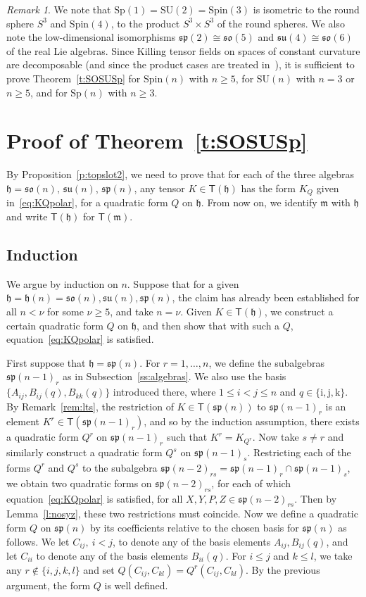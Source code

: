 \documentclass[12pt,reqno]{amsart}
\newcommand \Sp{\mathrm{Sp}}
\newcommand \SU{\mathrm{SU}}
\newcommand \Spin{\mathrm{Spin}}
\newcommand \sT{\mathsf{T}}
\newcommand\h{\mathfrak h}
\newcommand\m{\mathfrak m}
\newcommand \so{\mathfrak{so}}
\newcommand \spg{\mathfrak{sp}}
\newcommand \su{\mathfrak{su}}
\newcommand \ir{\mathrm{i}}
\newcommand \jr{\mathrm{j}}
\newcommand \kr{\mathrm{k}}
\newcommand \<{\langle}
\renewcommand \>{\rangle}
\theoremstyle{definition}
\theoremstyle{remark}
\newtheorem{remark}{Remark}
\begin{document}
	\begin{remark} \label{rem:low}
		We note that $\Sp(1)=\SU(2)=\Spin(3)$ is isometric to the round sphere $S^3$ and $\Spin(4)$, to the product $S^3 \times S^3$ of the round spheres. We also note the low-dimensional isomorphisms $\spg(2)\cong\so(5)$ and $\su(4)\cong\so(6)$ of the real Lie algebras. Since Killing tensor fields on spaces of constant curvature are decomposable (and since the product cases are treated in~\cite[Theorem~1]{MN2}), it is sufficient to prove Theorem~\ref{t:SOSUSp} for $\Spin(n)$ with $n\geq 5$, for $\SU(n)$ with $n=3$ or $n\geq 5$, and for $\Sp(n)$ with $n\geq 3$.
	\end{remark}
	
	
	\section{Proof of Theorem~\ref{t:SOSUSp}}
	\label{s:proof}
	
	By Proposition~\ref{p:topslot2}, we need to prove that for each of the three algebras $\h = \so(n), \, \su(n)$, $\spg(n)$, any tensor $K \in \sT(\h)$ has the form $K_Q$ given in~\eqref{eq:KQpolar}, for a quadratic form $Q$ on $\h$. From now on, we identify $\m$ with $\h$ and write $\sT(\h)$ for $\sT(\m)$.
	
	\subsection{Induction}
	\label{ss:induction}
	
	We argue by induction on $n$. Suppose that for a given $\h=\h(n) = \so(n), \su(n), \spg(n)$, the claim has already been established for all $n < \nu$ for some $\nu \ge 5$, and take $n = \nu$. Given $K \in \sT(\h)$, we construct a certain quadratic form $Q$ on $\h$, and then show that with such a $Q$, equation~\eqref{eq:KQpolar} is satisfied.
	
	First suppose that $\h = \spg(n)$. For $r=1, \dots, n$, we define the subalgebras $\spg(n-1)_r$ as in Subsection~\ref{ss:algebras}. We also use the basis $\{A_{ij}, B_{ij}(q), B_{kk}(q)\}$ introduced there, where $1 \le i < j\le n$ and $q \in \{\ir,\jr,\kr\}$. By Remark~\ref{rem:lts}, the restriction of $K \in \sT(\spg(n))$ to $\spg(n-1)_r$ is an element $K^r \in \sT(\spg(n-1)_r)$, and so by the induction assumption, there exists a quadratic form $Q^r$ on $\spg(n-1)_r$ such that $K^r = K_{Q^r}$. Now take $s \ne r$ and similarly construct a quadratic form $Q^s$ on $\spg(n-1)_s$. Restricting each of the forms $Q^r$ and $Q^s$ to the subalgebra $\spg(n-2)_{rs} = \spg(n-1)_r \cap \spg(n-1)_s$, we obtain two quadratic forms on $\spg(n-2)_{rs}$, for each of which equation~\eqref{eq:KQpolar} is satisfied, for all $X, Y, P, Z \in \spg(n-2)_{rs}$. Then by Lemma~\ref{l:nosyz}, these two restrictions must coincide. Now we define a quadratic form $Q$ on $\spg(n)$ by its coefficients relative to the chosen basis for $\spg(n)$ as follows. We let $C_{ij}, \ i < j$, to denote any of the basis elements $A_{ij}, B_{ij}(q)$, and let $C_{ii}$ to denote any of the basis elements $B_{ii}(q)$. For $i \le j$ and $k \le l$, we take any $r \notin \{i,j,k,l\}$ and set $Q(C_{ij}, C_{kl}) = Q^r(C_{ij}, C_{kl})$. By the previous argument, the form $Q$ is well defined.
	
\end{document}

